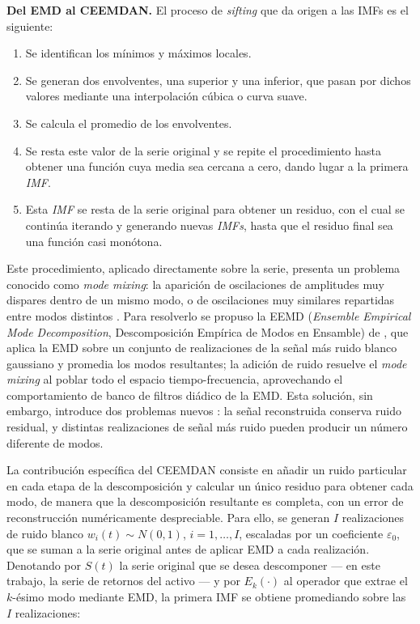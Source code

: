 \documentclass[12pt]{paper}
\begin{document}
\medskip
\noindent\textbf{Del EMD al CEEMDAN.}
El proceso de \textit{sifting} que da origen a las IMFs es el siguiente:
\begin{enumerate}
    \item Se identifican los mínimos y máximos locales.
    \item Se generan dos envolventes, una superior y una inferior, que pasan por dichos valores mediante una interpolación cúbica o curva suave.
    \item Se calcula el promedio de los envolventes.
    \item Se resta este valor de la serie original y se repite el procedimiento hasta obtener una función cuya media sea cercana a cero, dando lugar a la primera \textit{IMF}.
    \item Esta \textit{IMF} se resta de la serie original para obtener un residuo, con el cual se continúa iterando y generando nuevas \textit{IMFs}, hasta que el residuo final sea una función casi monótona.
\end{enumerate}

Este procedimiento, aplicado directamente sobre la serie, presenta un problema conocido como \emph{mode mixing}: la aparición de oscilaciones de amplitudes muy dispares dentro de un mismo modo, o de oscilaciones muy similares repartidas entre modos distintos \citep{torres2011ceemdan}. Para resolverlo se propuso la EEMD (\textit{Ensemble Empirical Mode Decomposition}, Descomposición Empírica de Modos en Ensamble) de \citet{wu2009eemd}, que aplica la EMD sobre un conjunto de realizaciones de la señal más ruido blanco gaussiano y promedia los modos resultantes; la adición de ruido resuelve el \emph{mode mixing} al poblar todo el espacio tiempo-frecuencia, aprovechando el comportamiento de banco de filtros diádico de la EMD. Esta solución, sin embargo, introduce dos problemas nuevos \citep{torres2011ceemdan}: la señal reconstruida conserva ruido residual, y distintas realizaciones de señal más ruido pueden producir un número diferente de modos.

La contribución específica del CEEMDAN \citep{torres2011ceemdan} consiste en añadir un ruido particular en cada etapa de la descomposición y calcular un único residuo para obtener cada modo, de manera que la descomposición resultante es completa, con un error de reconstrucción numéricamente despreciable. Para ello, se generan $I$ realizaciones de ruido blanco $w_i(t) \sim N(0,1)$, $i = 1,\ldots,I$, escaladas por un coeficiente $\varepsilon_0$, que se suman a la serie original antes de aplicar EMD a cada realización. Denotando por $S(t)$ la serie original que se desea descomponer --- en este trabajo, la serie de retornos del activo --- y por $E_k(\cdot)$ al operador que extrae el $k$-ésimo modo mediante EMD, la primera IMF se obtiene promediando sobre las $I$ realizaciones:
\end{document}
